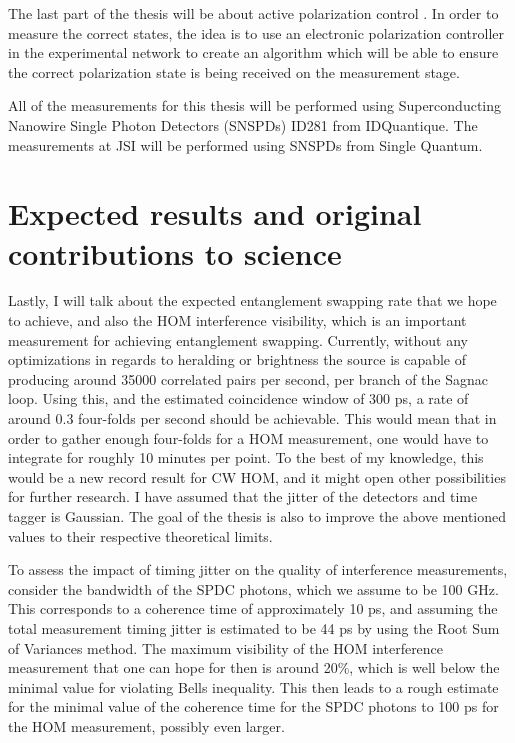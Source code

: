 \documentclass{article}
\theoremstyle{mytheoremstyle}
\theoremstyle{mytheoremstyle}
\theoremstyle{myproblemstyle}
\begin{document}
The last part of the thesis will be about active polarization control %
\cite{CCSHDCDRS}. In order to measure the correct states, the
idea is to use an electronic polarization controller in the experimental network to create an algorithm which will be able to
ensure the correct polarization state is being received on the measurement stage.

All of the measurements for this thesis will be performed using Superconducting Nanowire Single Photon Detectors (SNSPDs) ID281 from IDQuantique. The
measurements at JSI will be performed using SNSPDs from Single Quantum.


\section{Expected results and original contributions to science}
Lastly, I will talk about the expected entanglement swapping rate that we hope to achieve, and also the HOM interference visibility, which
is an important measurement for achieving entanglement swapping. Currently, without any optimizations in regards to heralding
or brightness the source is capable of producing around 35000 correlated pairs per second, per branch of the Sagnac loop.
Using this, and the estimated coincidence window of 300 ps, a rate of around 0.3 four-folds per second should be achievable.
This would mean that in order to gather enough four-folds for a HOM measurement, one would have to integrate for roughly 10 minutes per point.
To the best of my knowledge, this would be a new record result for CW HOM, and it might open other possibilities for further research.
I have assumed that the jitter of the detectors and time tagger is Gaussian. The goal of the thesis is also to improve the above mentioned
values to their respective theoretical limits.
\par To assess the impact of timing jitter on the quality of interference measurements, consider the bandwidth of the SPDC photons, which we assume
to be 100 GHz. This corresponds to a coherence time of approximately 10 ps, and assuming the total measurement timing jitter is estimated
to be 44 ps by using the Root Sum of Variances method.
The maximum visibility of the HOM interference measurement that one can hope for then is around 20\%, which is well below the minimal value for violating
Bells inequality.
This then leads to a rough estimate for the minimal value of the coherence time for the SPDC photons to 100 ps for the HOM measurement, possibly even larger.
\end{document}
